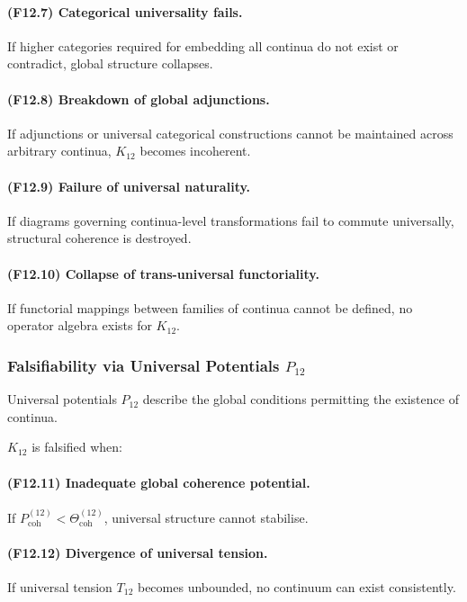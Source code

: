 \paragraph{(F12.7) Categorical universality fails.}
If higher categories required for embedding all continua do not exist or
contradict, global structure collapses.

\paragraph{(F12.8) Breakdown of global adjunctions.}
If adjunctions or universal categorical constructions cannot be
maintained across arbitrary continua, $K_{12}$ becomes incoherent.

\paragraph{(F12.9) Failure of universal naturality.}
If diagrams governing continua-level transformations fail to commute
universally, structural coherence is destroyed.

\paragraph{(F12.10) Collapse of trans-universal functoriality.}
If functorial mappings between families of continua cannot be defined,
no operator algebra exists for $K_{12}$.



\subsubsection{Falsifiability via Universal Potentials $P_{12}$}

Universal potentials $P_{12}$ describe the global conditions permitting
the existence of continua.

$K_{12}$ is falsified when:

\paragraph{(F12.11) Inadequate global coherence potential.}
If $P_{\mathrm{coh}}^{(12)} < \Theta_{\mathrm{coh}}^{(12)}$,  
universal structure cannot stabilise.

\paragraph{(F12.12) Divergence of universal tension.}
If universal tension $T_{12}$ becomes unbounded,  
no continuum can exist consistently.

